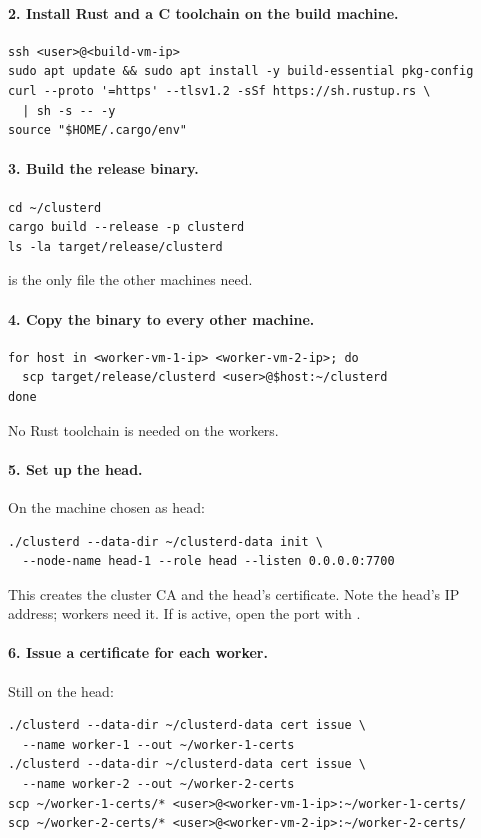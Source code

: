 \documentclass{article}
\begin{document}
\paragraph{2. Install Rust and a C toolchain on the build machine.}
\begin{verbatim}
ssh <user>@<build-vm-ip>
sudo apt update && sudo apt install -y build-essential pkg-config
curl --proto '=https' --tlsv1.2 -sSf https://sh.rustup.rs \
  | sh -s -- -y
source "$HOME/.cargo/env"
\end{verbatim}

\paragraph{3. Build the release binary.}
\begin{verbatim}
cd ~/clusterd
cargo build --release -p clusterd
ls -la target/release/clusterd
\end{verbatim}
 is the only file the other machines need.

\paragraph{4. Copy the binary to every other machine.}
\begin{verbatim}
for host in <worker-vm-1-ip> <worker-vm-2-ip>; do
  scp target/release/clusterd <user>@$host:~/clusterd
done
\end{verbatim}
No Rust toolchain is needed on the workers.

\paragraph{5. Set up the head.} On the machine chosen as head:
\begin{verbatim}
./clusterd --data-dir ~/clusterd-data init \
  --node-name head-1 --role head --listen 0.0.0.0:7700
\end{verbatim}
This creates the cluster CA and the head's certificate. Note the head's
IP address; workers need it. If  is active, open the port with
\code{sudo ufw allow 7700/tcp}.

\paragraph{6. Issue a certificate for each worker.} Still on the head:
\begin{verbatim}
./clusterd --data-dir ~/clusterd-data cert issue \
  --name worker-1 --out ~/worker-1-certs
./clusterd --data-dir ~/clusterd-data cert issue \
  --name worker-2 --out ~/worker-2-certs
scp ~/worker-1-certs/* <user>@<worker-vm-1-ip>:~/worker-1-certs/
scp ~/worker-2-certs/* <user>@<worker-vm-2-ip>:~/worker-2-certs/
\end{verbatim}
\end{document}
